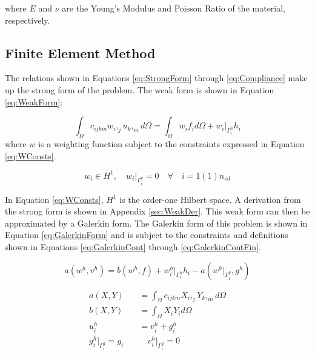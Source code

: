 \documentclass[a4paper, 12pt]{article}
\begin{document}
\noindent

\noindent
where $E$ and $\nu$ are the Young's Modulus and Poisson Ratio
of the material, respectively.

\subsection{Finite Element Method} \label{subsec:fem}
The relations shown in Equations \ref{eq:StrongForm} through
\ref{eq:Compliance} make up the strong form of the problem.
The weak form is shown in Equation \ref{eq:WeakForm}:

\begin{equation} \label{eq:WeakForm}
\int_{\Omega} c_{ijkm} w_{i},_{j} u_{k},_{m} d\Omega =
  \int_{\Omega} w_{i} f_{i} d\Omega +
  w_{i}\Big|_{\Gamma^{h}_{i}} h_{i}
\end{equation}
\noindent
where $w$ is a weighting function subject to the constraints
expressed in Equation \ref{eq:WConsts}.

\begin{equation} \label{eq:WConsts}
w_{i} \in H^1,\quad w_{i}\Big|_{\Gamma^{g}_{i}} = 0
    \quad \forall \quad i=1(1)n_{sd}
\end{equation}

\noindent
In Equation \ref{eq:WConsts}, $H^{1}$ is the order-one Hilbert space.
A derivation from the strong form is shown in Appendix \ref{sec:WeakDer}.
This weak form can then be approximated by a Galerkin form.
The Galerkin form of this problem is shown in Equation
\ref{eq:GalerkinForm} and is subject to the constraints and definitions
shown in Equations \ref{eq:GalerkinCont}
through  \ref{eq:GalerkinContFin}.

\begin{equation} \label{eq:GalerkinForm}
a(w^{h} , v^{h})
  = b(w^{h} , f)
  + w^{h}_{i}\Big|_{\Gamma^{h}_{i}} h_{i}
  - a(w^{h}\Big|_{\Gamma^{g}_{i}} , g^{h})
\end{equation}

\begin{align}
a( X, Y ) &=
  \int_{\Omega} c_{ijkm} X_{i},_{j} Y_{k},_{m} d\Omega
    \label{eq:GalerkinCont}                                           \\
b( X, Y ) &=
  \int_{\Omega} X_{i} Y_{i} d\Omega
    \label{eq:GalerkinForce}                                          \\
u^{h}_{i} &=
  v^{h}_{i} + g^{h}_{i}
  \label{eq:GalerkinUh}                                               \\
g^{h}_{i}\Big|_{\Gamma^{g}_{i}} = g_{i}
  \quad & \quad
  v^{h}_{i}\Big|_{\Gamma^{g}_{i}} = 0
  \label{eq:GalerkinContFin}                                       %
\end{align}
\end{document}
